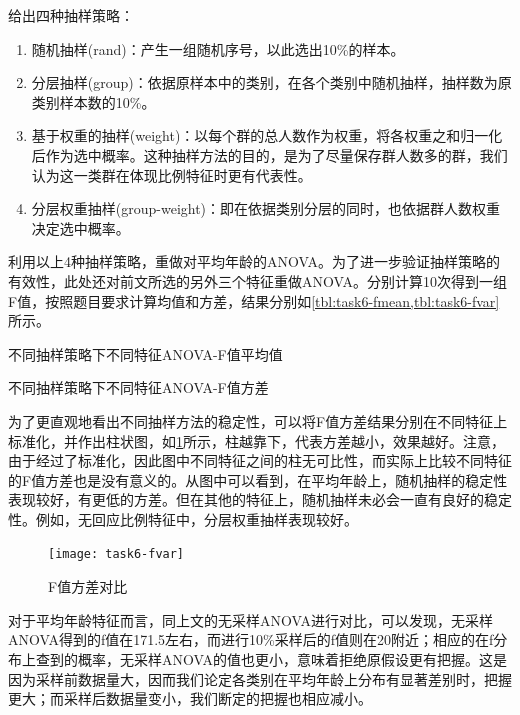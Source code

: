 \documentclass[a4paper,12pt]{article}
\begin{document}
    给出四种抽样策略：
    \begin{enumerate}
      \item 随机抽样(rand)：产生一组随机序号，以此选出10\%的样本。
      \item 分层抽样(group)：依据原样本中的类别，在各个类别中随机抽样，抽样数为原类别样本数的10\%。
      \item 基于权重的抽样(weight)：以每个群的总人数作为权重，将各权重之和归一化后作为选中概率。这种抽样方法的目的，是为了尽量保存群人数多的群，我们认为这一类群在体现比例特征时更有代表性。
      \item 分层权重抽样(group-weight)：即在依据类别分层的同时，也依据群人数权重决定选中概率。
    \end{enumerate}

    利用以上4种抽样策略，重做对平均年龄的ANOVA。为了进一步验证抽样策略的有效性，此处还对前文所选的另外三个特征重做ANOVA。分别计算10次得到一组F值，按照题目要求计算均值和方差，结果分别如\cref{tbl:task6-fmean,tbl:task6-fvar}所示。

    \begin{table}[htbp]
      \centering
      \caption{不同抽样策略下不同特征ANOVA-F值平均值}
      \label{tbl:task6-fmean}
      
    \end{table}
    \begin{table}[htbp]
      \centering
      \caption{不同抽样策略下不同特征ANOVA-F值方差}
      \label{tbl:task6-fvar}
      
    \end{table}

    为了更直观地看出不同抽样方法的稳定性，可以将F值方差结果分别在不同特征上标准化，并作出柱状图，如\cref{fig:task6-fvar}所示，柱越靠下，代表方差越小，效果越好。注意，由于经过了标准化，因此图中不同特征之间的柱无可比性，而实际上比较不同特征的F值方差也是没有意义的。从图中可以看到，在平均年龄上，随机抽样的稳定性表现较好，有更低的方差。但在其他的特征上，随机抽样未必会一直有良好的稳定性。例如，无回应比例特征中，分层权重抽样表现较好。

    \begin{figure}[htbp]
      \centering
      \texttt{[image: task6-fvar]}
      \caption{F值方差对比}
      \label{fig:task6-fvar}
    \end{figure}

    对于平均年龄特征而言，同上文的无采样ANOVA进行对比，可以发现，无采样ANOVA得到的f值在171.5左右，而进行10\%采样后的f值则在20附近；相应的在f分布上查到的概率，无采样ANOVA的值也更小，意味着拒绝原假设更有把握。这是因为采样前数据量大，因而我们论定各类别在平均年龄上分布有显著差别时，把握更大；而采样后数据量变小，我们断定的把握也相应减小。
\end{document}
